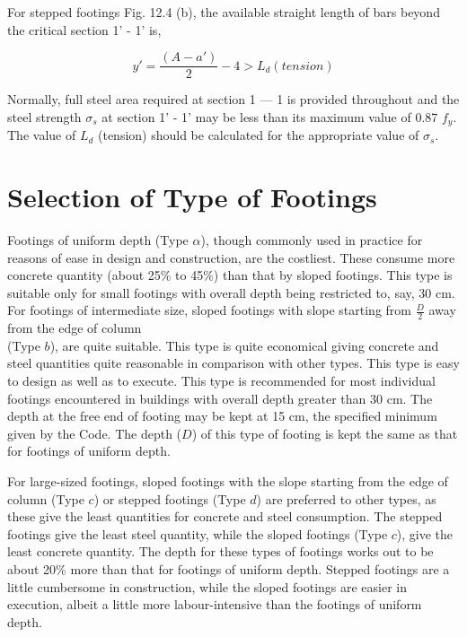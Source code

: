 \documentclass{book}
\begin{document}
For stepped footings Fig. 12.4 (b), the available straight length of bars beyond the critical
section 1’ - 1’ is,
                                                          
\begin{equation}                                                        
        y'= \frac{(A-a')}{2}-4 >L_d (tension)                                      
\end{equation}

Normally, full steel area required at section 1 — 1 is provided throughout and the steel strength $\sigma_s$ at section 1’ - 1’ may be less than its maximum value of 0.87 $f_y$. The value of $L_d$ (tension) should be calculated for the appropriate value of $\sigma_s$.

\newpage
\section{Selection of Type of Footings}
Footings of uniform depth (Type $\alpha$), though commonly used in practice for reasons of ease in design and construction, are the costliest. These consume more concrete quantity (about 25\% to 45\%) than that by sloped footings. This type is suitable only for small footings with overall depth being restricted to, say, 30 cm.\\

For footings of intermediate size, sloped footings with slope starting from $\frac{D}{2}$ away from the edge of column\\

(Type $b$), are quite suitable. This type is quite economical giving concrete and steel quantities quite reasonable in comparison with other types. This type is easy to design as well as to execute. This type is recommended for most individual footings encountered in buildings with overall depth greater than 30 cm. The depth at the free end of footing may be kept at 15 cm, the specified minimum given by the Code. The depth ($D$) of this type of footing is kept the same as that for footings of uniform depth.


For large-sized footings, sloped footings with the slope starting from the edge of column
(Type $c$) or stepped footings (Type $d$) are preferred to other types, as these give the least quantities for concrete and steel consumption. The stepped footings give the least steel quantity, while the sloped footings (Type $c$), give the least concrete quantity. The depth for these types of footings works out to be about 20\% more than that for footings of uniform depth. Stepped footings are a little cumbersome in construction, while the sloped footings are easier in execution, albeit a little more labour-intensive than the footings of uniform depth.
\end{document}
